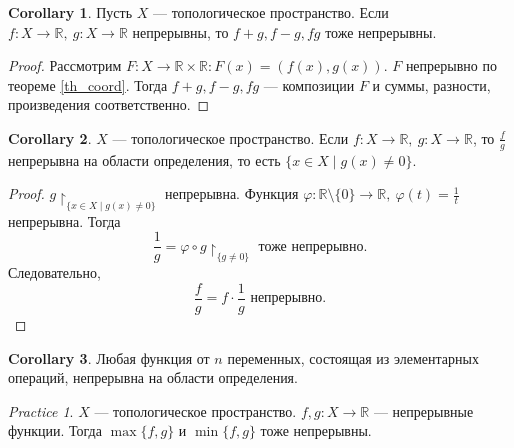 \documentclass[11pt]{book}
\newcommand{\R}{\mathbb{R}}
\theoremstyle{definition}
\theoremstyle{plain}
\theoremstyle{plain}
\theoremstyle{definition}
\newtheorem*{cor}{Corollary}
\theoremstyle{remark}
\newtheorem*{prac}{Practice}
\begin{document}
\begin{cor}
    Пусть $ X$ --- топологическое пространство. Если $ f: X \to  \R, ~ g : X \to  \R$ непрерывны, то $ f+g, f-g, fg$ тоже непрерывны.
\end{cor}
\begin{proof}
    Рассмотрим $ F: X \to \R \times \R: F(x) = (f(x), g(x))$. $ F$ непрерывно по теореме \ref{th_coord}.
    Тогда $ f+g, f-g, fg$ --- композиции  $ F$ и суммы, разности, произведения соответственно.
\end{proof}
\begin{cor}
    $ X$ --- топологическое пространство.  Если $ f: X \to  \R, ~ g: X \to \R$, то $ \frac{f}{g}$ непрерывна на области определения, то есть $ \{x \in X\mid g(x) \ne 0\}$.
\end{cor}
\begin{proof}
    $ g\!\!\upharpoonright_{\{x \in X\mid g(x) \ne  0\}}$ непрерывна.
    Функция $ \varphi : \R\setminus \{0\} \to  \R, ~ \varphi (t)  = \frac{1}{t}$ непрерывна.
    Тогда
    \[
    \frac{1}{g} = \varphi \circ g\!\!\upharpoonright_{\{g\ne 0\}} \text{ тоже непрерывно}
    .\] 
    Следовательно,
    \[
    \frac{f}{g} = f \cdot \frac{1}{g} \text{ непрерывно}
    .\] 
\end{proof}
\begin{cor}
    Любая функция от $ n$ переменных, состоящая из элементарных операций, непрерывна на области определения.
\end{cor}
\begin{prac}
    $ X$ --- топологическое пространство. $ f, g: X \to  \R$ --- непрерывные функции. Тогда $ \max \{f, g\}$ и $ \min \{f, g\}$ тоже непрерывны.
\end{prac}
\end{document}
